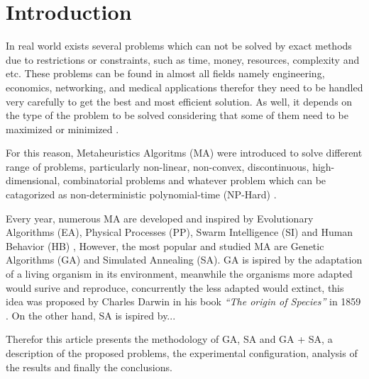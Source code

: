 \section*{Introduction}


  In real world exists several problems which can not be solved by exact methods 
  due to restrictions or constraints, such as time, money, resources, 
  complexity and etc. These problems can be found in almost
  all fields namely engineering, economics, networking, and medical applications
  therefor they need to be handled very carefully to get the best and most efficient solution. 
  As well, it depends on the type of the problem to be solved considering that some of them need to be
  maximized or minimized \cite{talbi2009metaheuristics}. 
  
  For this reason, Metaheuristics Algoritms (MA) were introduced to solve different range of
  problems, particularly non-linear, non-convex, discontinuous, high-dimensional, combinatorial problems
  and whatever problem which can be catagorized as non-deterministic polynomial-time (NP-Hard) 
  \cite{almufti2017using}.

  Every year, numerous MA are developed and inspired by Evolutionary Algorithms (EA), Physical Processes (PP),
  Swarm Intelligence (SI) and Human Behavior (HB) \cite{almufti2022lion}, \cite{agrawal2021metaheuristic}
  However, the most popular and studied MA are Genetic Algorithms (GA) and Simulated Annealing (SA). GA is ispired by
  the adaptation of a living organism in its environment, meanwhile the organisms more adapted would surive
  and reproduce, concurrently the less adapted would extinct, this idea was proposed by Charles Darwin in his book 
  \textit{``The origin of Species''} in 1859 \cite{darwin1859origin}. On the other hand, SA is ispired by... 
  

  Therefor this article presents the methodology of GA, SA and GA + SA, a description of the proposed problems,
  the experimental configuration, analysis of the results and finally the conclusions.




